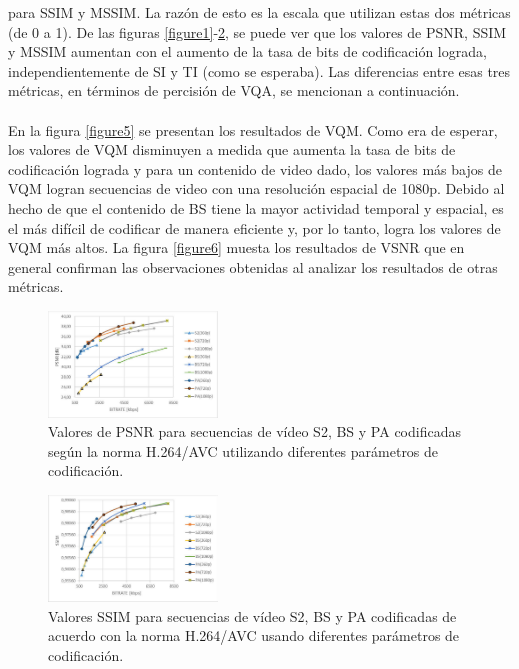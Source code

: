 \documentclass[conference]{IEEEtran}
\begin{document}
    para SSIM y MSSIM. La razón de esto es la escala que utilizan estas 
    dos métricas (de 0 a 1). De las figuras \ref{figure1}-\ref{figure3}, se puede ver que los valores 
    de PSNR, SSIM y MSSIM aumentan con el aumento de la tasa de bits 
    de codificación lograda, independientemente de SI y TI (como se 
    esperaba). Las diferencias entre esas tres métricas, en términos de 
    percisión de VQA, se mencionan a continuación.\\
    \\
    En la figura \ref{figure5} se presentan los resultados de VQM. Como era de esperar, 
    los valores de VQM disminuyen a medida que aumenta la tasa de bits 
    de codificación lograda y para un contenido de video dado, los valores 
    más bajos de VQM logran secuencias de video con una resolución 
    espacial de 1080p. Debido al hecho de que el contenido de BS tiene la 
    mayor actividad temporal y espacial, es el más difícil de codificar de 
    manera eficiente y, por lo tanto, logra los valores de VQM más altos. 
    La figura \ref{figure6} muesta los resultados de VSNR que en general confirman 
    las observaciones obtenidas al analizar los resultados de otras 
    métricas.

    \begin{figure}[H]
        \centering
        \includegraphics[width=0.4\textwidth]{img/fig2.png}
        \caption{Valores de PSNR para secuencias de vídeo S2, BS y PA codificadas 
        según la norma H.264/AVC utilizando diferentes parámetros de 
        codificación.}
        \label{figure2}
    \end{figure}

    \begin{figure}[H]
        \centering
        \includegraphics[width=0.4\textwidth]{img/fig3.png}
        \caption{Valores SSIM para secuencias de vídeo S2, BS y PA codificadas de 
        acuerdo con la norma H.264/AVC usando diferentes parámetros de 
        codificación.}
        \label{figure3}
    \end{figure}
\end{document}
